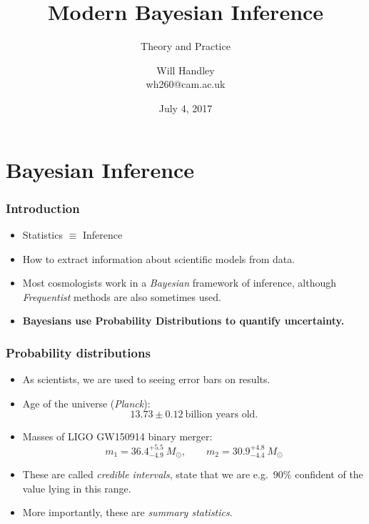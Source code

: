 \documentclass[%
]{beamer}
\title{Modern Bayesian Inference}
\subtitle{Theory and Practice}
\author[Handley] %
{Will Handley\\ \small{wh260@cam.ac.uk}}
\institute[University of Cambridge] %
{%
Astrophysics Group \\
Cavendish Laboratory \\
University of Cambridge
}
\date{July 4, 2017}
\begin{document}
\begin{frame}
  \titlepage
\end{frame}


\section{Bayesian Inference}
\begin{frame}
    \frametitle{Introduction}
    \begin{itemize}
        \pause\item Statistics $\equiv$ Inference 
        \pause\item How to extract information about scientific models from data.
        \pause\item Most cosmologists work in a {\em Bayesian\/} framework of inference, although {\em Frequentist\/} methods are also sometimes used.
        \pause\item {\bf Bayesians use Probability Distributions to quantify uncertainty.}
    \end{itemize}
\end{frame}

\begin{frame}
    \frametitle{Probability distributions}

    \begin{itemize}
        \pause\item As scientists, we are used to seeing error bars on results.
        \pause\item Age of the universe ({\em Planck\/}): 
        \pause \[13.73\pm 0.12\:\text{billion years old.}\]
        \pause\item Masses of LIGO GW150914 binary merger: 
        \[m_1 = 36.4^{+5.5}_{-4.9}\:M_\odot,\qquad m_2 = 30.9^{+4.8}_{-4.4}\:M_\odot \]
        \pause\item These are called {\em credible intervals}, state that we are e.g.\ $90\%$ confident of the value lying in this range.
        \pause\item More importantly, these are {\em summary statistics}.
    \end{itemize}
\end{frame}
\end{document}
